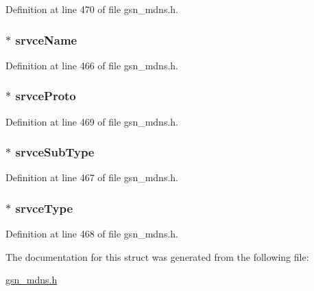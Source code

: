 Definition at line 470 of file gsn\_\-mdns.h.

\hypertarget{a00147_a04b7b35934b06d9d838a42dc302525c4}{
\subsubsection[{srvceName}]{$\ast$ {\bf srvceName}}}
\label{a00147_a04b7b35934b06d9d838a42dc302525c4}


Definition at line 466 of file gsn\_\-mdns.h.

\hypertarget{a00147_a9dd2986de2728362170d70c3a10d605c}{
\subsubsection[{srvceProto}]{$\ast$ {\bf srvceProto}}}
\label{a00147_a9dd2986de2728362170d70c3a10d605c}


Definition at line 469 of file gsn\_\-mdns.h.

\hypertarget{a00147_a1abfc1470aad0566d2bd0f9566dced35}{
\subsubsection[{srvceSubType}]{$\ast$ {\bf srvceSubType}}}
\label{a00147_a1abfc1470aad0566d2bd0f9566dced35}


Definition at line 467 of file gsn\_\-mdns.h.

\hypertarget{a00147_ae936821f0b28aba244cd7270eab50b96}{
\subsubsection[{srvceType}]{$\ast$ {\bf srvceType}}}
\label{a00147_ae936821f0b28aba244cd7270eab50b96}


Definition at line 468 of file gsn\_\-mdns.h.



The documentation for this struct was generated from the following file:\begin{DoxyCompactItemize}
\item 
\hyperlink{a00526}{gsn\_\-mdns.h}\end{DoxyCompactItemize}
